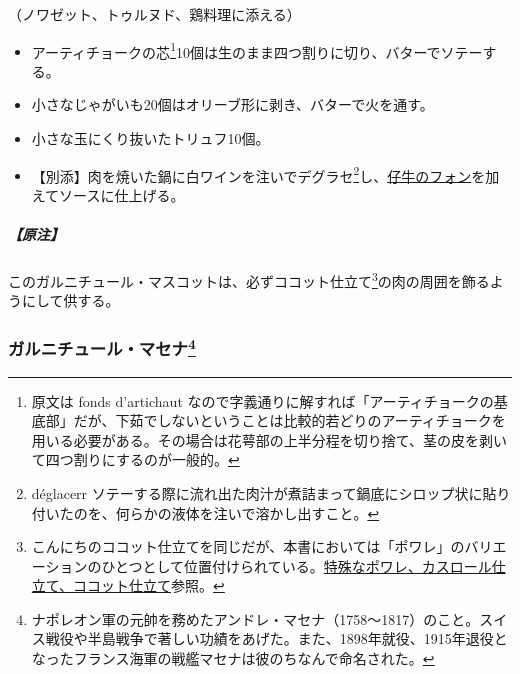 \begin{recette}


（ノワゼット、トゥルヌド、鶏料理に添える）

\begin{itemize}
\item
  アーティチョークの芯\footnote{原文は fonds d'artichaut
    なので字義通りに解すれば「アーティチョークの基底部」だが、下茹でしないということは比較的若どりのアーティチョークを用いる必要がある。その場合は花萼部の上半分程を切り捨て、茎の皮を剥いて四つ割りにするのが一般的。}10個は生のまま四つ割りに切り、バターでソテーする。
\item
  小さなじゃがいも20個はオリーブ形に剥き、バターで火を通す。
\item
  小さな玉にくり抜いたトリュフ10個。
\item
  【別添】肉を焼いた鍋に白ワインを注いでデグラセ\footnote{déglacerr
    ソテーする際に流れ出た肉汁が煮詰まって鍋底にシロップ状に貼り付いたのを、何らかの液体を注いで溶かし出すこと。}し、\protect\hyperlink{fonds-de-veau-brun}{仔牛のフォン}を加えてソースに仕上げる。
\end{itemize}

\hypertarget{nota-garniture-mascotte}{%
\subparagraph{【原注】}\label{nota-garniture-mascotte}}

このガルニチュール・マスコットは、必ずココット仕立て\footnote{こんにちのココット仕立てを同じだが、本書においては「ポワレ」のバリエーションのひとつとして位置付けられている。\protect\hyperlink{poeles-speciaux-dits-en-casserole-ou-en-cocotte}{特殊なポワレ、カスロール仕立て、ココット仕立て}参照。}の肉の周囲を飾るようにして供する。

\atoaki{}

\hypertarget{garniture-massena}{%
\subsubsection[ガルニチュール・マセナ]{\texorpdfstring{ガルニチュール・マセナ\footnote{ナポレオン軍の元帥を務めたアンドレ・マセナ（1758〜1817）のこと。スイス戦役や半島戦争で著しい功績をあげた。また、1898年就役、1915年退役となったフランス海軍の戦艦マセナは彼のちなんで命名された。}}{ガルニチュール・マセナ}}\label{garniture-massena}}



\end{recette}
